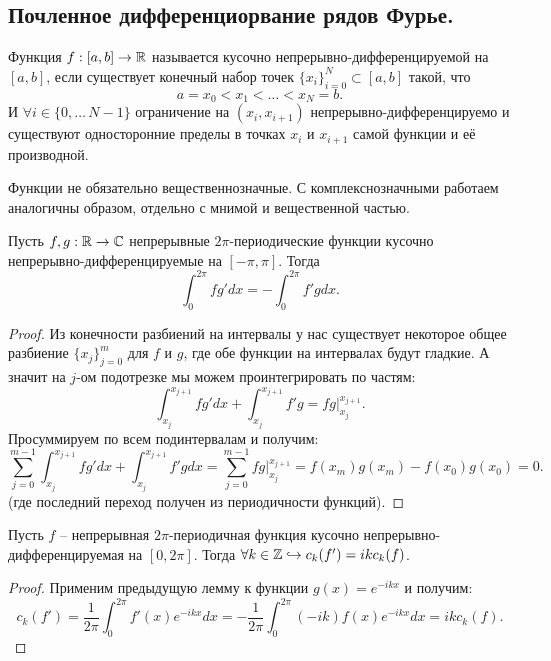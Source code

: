 \subsection{Почленное дифференциорвание рядов Фурье.}
\begin{reminder}
    Функция $f: [a, b] \to \mathbb{R}$ называется кусочно непрерывно-дифференцируемой на $[a, b]$, если существует конечный набор точек $\{x_i\}_{i = 0}^{N} \subset [a, b]$ такой, что
    \[
        a = x_0 < x_1 < \ldots < x_N = b.
    \]
    И $\forall i \in \{0, \ldots\, N - 1\}$ ограничение на $(x_i, x_{i + 1})$ непрерывно-дифференцируемо и существуют односторонние пределы в точках $x_i$ и $x_{i + 1}$ самой функции и её производной.
\end{reminder}
\begin{note}
    Функции не обязательно вещественнозначные.
    С комплекснозначными работаем аналогичны образом, отдельно с мнимой и вещественной частью.
\end{note}
\begin{lemma}
    Пусть $f, g: \mathbb{R} \to \mathbb{C}$ непрерывные $2\pi$-периодические функции кусочно непрерывно-дифференцируемые на $[-\pi, \pi]$.
    Тогда
    \[
        \int_0^{2\pi} f g' dx = - \int_0^{2\pi} f' g dx.
    \]
\end{lemma}
\begin{proof}
    Из конечности разбиений на интервалы у нас существует некоторое общее разбиение $\{x_j\}_{j = 0}^m$ для $f$ и $g$, где обе функции на интервалах будут гладкие.
    А значит на $j$-ом подотрезке мы можем проинтегрировать по частям:
    \[
        \int_{x_j}^{x_{j + 1}} f g' dx + \int_{x_j}^{x_{j + 1}} f' g = fg|_{x_j}^{x_{j + 1}}.
    \]
    Просуммируем по всем подинтервалам и получим:
    \[
        \sum\limits_{j = 0}^{m - 1} \int_{x_j}^{x_{j + 1}} fg'dx + \int_{x_{j}}^{x_{j + 1}}f' g dx = \sum\limits_{j = 0}^{m - 1} fg|_{x_j}^{x_{j + 1}} = f(x_m)g(x_m) - f(x_0)g(x_0) = 0.
    \]
    (где последний переход получен из периодичности функций).
\end{proof}
\begin{lemma}
    Пусть $f$ -- непрерывная $2\pi$-периодичная функция кусочно непрерывно-дифференцируемая на $[0, 2\pi]$.
    Тогда $\forall k \in \mathbb{Z} \hookrightarrow c_k(f') = ik c_k(f)$.
\end{lemma}
\begin{proof}
    Применим предыдущую лемму к функции $g(x) = e^{-i k x}$ и получим:
    \[
        c_k(f') = \frac{1}{2\pi} \int_0^{2\pi} f'(x)e^{-ikx}dx = -\frac{1}{2\pi} \int_0^{2\pi}(-i k)f(x)e^{-ikx}dx = ikc_k(f).
    \]
\end{proof}
